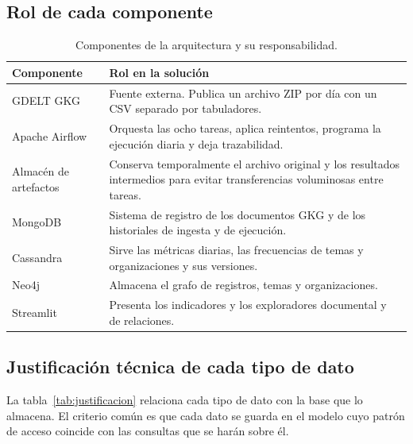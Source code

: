 \documentclass[11pt,a4paper]{article}
\begin{document}
\subsection{Rol de cada componente}

\begin{table}[H]
\centering
\small
\begin{tabularx}{\textwidth}{@{}l>{\raggedright\arraybackslash}X@{}}
\toprule
Componente & Rol en la solución \\
\midrule
GDELT GKG & Fuente externa. Publica un archivo ZIP por día con un CSV separado por tabuladores. \\
Apache Airflow & Orquesta las ocho tareas, aplica reintentos, programa la ejecución diaria y deja trazabilidad. \\
Almacén de artefactos & Conserva temporalmente el archivo original y los resultados intermedios para evitar transferencias voluminosas entre tareas. \\
MongoDB & Sistema de registro de los documentos GKG y de los historiales de ingesta y de ejecución. \\
Cassandra & Sirve las métricas diarias, las frecuencias de temas y organizaciones y sus versiones. \\
Neo4j & Almacena el grafo de registros, temas y organizaciones. \\
Streamlit & Presenta los indicadores y los explora\-dores documental y de relaciones. \\
\bottomrule
\end{tabularx}
\caption{Componentes de la arquitectura y su responsabilidad.}
\end{table}

\subsection{Justificación técnica de cada tipo de dato}\label{sec:justificacion}

La tabla~\ref{tab:justificacion} relaciona cada tipo de dato con la base que lo almacena. El criterio común es que cada dato se guarda en el modelo cuyo patrón de acceso coincide con las consultas que se harán sobre él.
\end{document}
